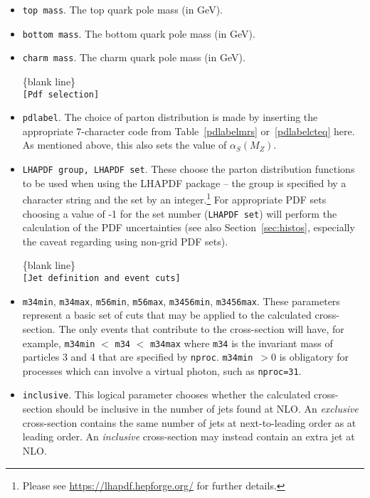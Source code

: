 \documentclass{article}
\begin{document}
\begin{itemize}
\begin{center}
\{blank line\} \\
{\tt [Heavy quark masses] }
\end{center}
\item {\tt top mass}. The top quark pole mass (in GeV).
\item {\tt bottom mass}. The bottom quark pole mass (in GeV).
\item {\tt charm mass}. The charm quark pole mass (in GeV).

\begin{center}
\{blank line\} \\
{\tt [Pdf selection] }
\end{center}

\item {\tt pdlabel}. The choice of parton distribution is made by
inserting the appropriate 7-character code from Table~\ref{pdlabelmrs}
or~\ref{pdlabelcteq} here.
As mentioned above, this also sets the value of $\alpha_S(M_Z)$.

\item {\tt LHAPDF group, LHAPDF set}. These choose the parton
distribution functions to be used when using the LHAPDF package --
the group is specified by a character string and the set by an integer.\footnote{Please see 
\url{https://lhapdf.hepforge.org/} for further details.}
For appropriate PDF sets choosing a value of -1 for the set number ({\tt  LHAPDF set}) 
will perform the calculation of the PDF uncertainties (see also
Section~\ref{sec:histos}, especially the caveat regarding using
non-grid PDF sets).

\begin{center}
\{blank line\} \\
{\tt [Jet definition and event cuts] }
\end{center}

\item {\tt m34min}, {\tt m34max}, {\tt m56min}, {\tt m56max}, {\tt m3456min}, {\tt m3456max}.
These parameters represent a basic set of cuts that may be applied
to the calculated cross-section. The only events that contribute to
the cross-section will have, for example,
{\tt m34min} $<$ {\tt m34} $<$ {\tt m34max} where {\tt m34} is the
invariant mass of particles 3 and 4 that are specified by {\tt nproc}.
{\tt m34min}~$> 0$ is obligatory for processes which can involve a virtual
photon, such as {\tt nproc=31}.
\item {\tt inclusive}.  This logical parameter chooses whether the
calculated cross-section should be inclusive in the number of jets
found at NLO. An {\em exclusive}
cross-section contains the same number of jets at next-to-leading
order as at leading order. An {\em inclusive} cross-section may
instead contain an extra jet at NLO.


\end{itemize}
\end{document}
